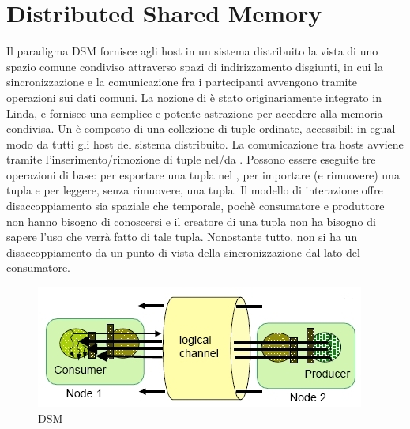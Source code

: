 \section{Distributed Shared Memory}
Il paradigma DSM\cite{eug} fornisce agli host in un sistema distribuito la vista di uno spazio comune condiviso attraverso spazi di indirizzamento disgiunti, in cui la sincronizzazione e la comunicazione fra i partecipanti avvengono tramite operazioni sui dati comuni. La nozione di  è stato originariamente integrato in Linda, e fornisce una semplice e potente astrazione per accedere alla memoria condivisa. Un  è composto di una collezione di tuple ordinate, accessibili in egual modo da tutti gli host del sistema distribuito. La comunicazione tra hosts avviene tramite l'inserimento/rimozione di tuple nel/da . Possono essere eseguite tre operazioni di base:  per esportare una tupla nel ,  per importare (e rimuovere) una tupla e  per leggere, senza rimuovere, una tupla. Il modello di interazione offre disaccoppiamento sia spaziale che temporale, pochè consumatore e produttore non hanno bisogno di conoscersi e il creatore di una tupla non ha bisogno di sapere l'uso che verrà fatto di tale tupla. Nonostante tutto, non si ha un disaccoppiamento da un punto di vista della sincronizzazione dal lato del consumatore.
\begin{figure}[H]
\begin{center}
\includegraphics[scale=0.7]{etc/dsm1.jpg}
\caption{DSM}
\label{dsm}
\end{center}
\end{figure} 

